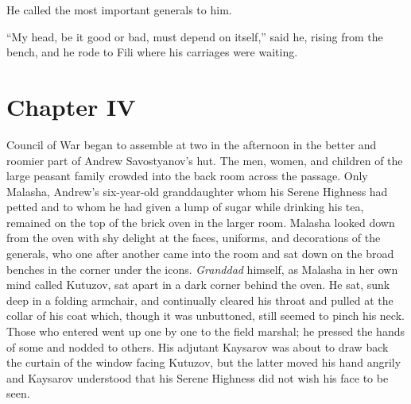 He called the most important generals to him.

``My head, be it good or bad, must depend on itself,'' said he,
rising from the bench, and he rode to Fili where his carriages
were waiting.


\chapter*{Chapter IV} \ifaudio {}
\fi

 Council of War began to assemble at two in the afternoon in
the better and roomier part of Andrew Savostyanov's hut. The men,
women, and children of the large peasant family crowded into the
back room across the passage. Only Malasha, Andrew's six-year-old
granddaughter whom his Serene Highness had petted and to whom he
had given a lump of sugar while drinking his tea, remained on the
top of the brick oven in the larger room. Malasha looked down
from the oven with shy delight at the faces, uniforms, and
decorations of the generals, who one after another came into the
room and sat down on the broad benches in the corner under the
icons. \emph{Granddad} himself, as Malasha in her own mind called
Kutuzov, sat apart in a dark corner behind the oven. He sat, sunk
deep in a folding armchair, and continually cleared his throat
and pulled at the collar of his coat which, though it was
unbuttoned, still seemed to pinch his neck. Those who entered
went up one by one to the field marshal; he pressed the hands of
some and nodded to others. His adjutant Kaysarov was about to
draw back the curtain of the window facing Kutuzov, but the
latter moved his hand angrily and Kaysarov understood that his
Serene Highness did not wish his face to be seen.

